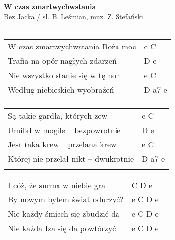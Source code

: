 \documentclass[a5paper]{article}
\begin{document}


\noindent
\fontsize{12pt}{15pt}\selectfont
\textbf{W czas zmartwychwstania} \\
\fontsize{8pt}{10pt}\selectfont
Bez Jacka / sł. B. Leśmian, muz. Z. Stefański \\ \\
\fontsize{10pt}{12pt}\selectfont
{}
\begin{tabular}{@{}p{7.50cm}p{3cm}@{}}
\noindent
W czas zmartwychwstania Boża moc & e C \\
Trafia na opór nagłych zdarzeń & D e \\
Nie wszystko stanie się w tę noc & e C \\
Według niebieskich wyobrażeń & D a7 e \\ \\
\end{tabular}

\noindent
\begin{tabular}{@{}p{7.50cm}p{3cm}@{}}
Są takie gardła, których zew & e C \\
Umilkł w mogile – bezpowrotnie & D e \\
Jest taka krew – przelana krew & e C \\
Której nie przelał nikt – dwukrotnie & D a7 e \\ \\
\end{tabular}

\noindent
\begin{tabular}{@{}p{7.50cm}p{3cm}@{}}
I cóż, że surma w niebie gra & C D e \\
By nowym bytem świat odurzyć? & e C D e \\
Nie każdy śmiech się zbudzić da & e C D e \\
Nie każda łza się da powtórzyć & e C D e
\end{tabular}
\end{document}
